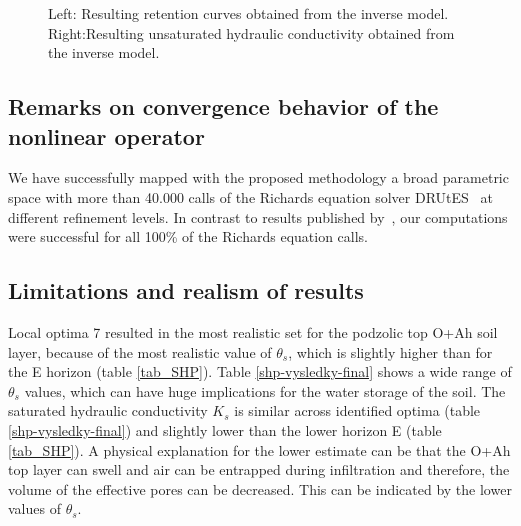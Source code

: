 \documentclass[review,times,3p,10pt]{elsarticle}
\begin{document}
\begin{figure}
\centering
{}
\caption{Left: Resulting retention curves obtained from the inverse model. Right:Resulting unsaturated hydraulic conductivity obtained from the inverse model. }
\label{retc-final}
\end{figure}

{
\subsection{Remarks on convergence behavior of the nonlinear operator}
\label{convsolver}
  We have successfully mapped with the proposed methodology a broad parametric space with more than 40.000 calls of the Richards equation solver DRUtES~\citep{drutes} at different refinement levels. In contrast to  results published by~\cite{beven2003-uncertain}, our computations were successful for all 100\% of the Richards equation calls. }  


\subsection{Limitations and realism of results}


Local optima 7 resulted in the most realistic set for the podzolic top O+Ah soil layer, because of the most realistic value of $\theta_s$, which is slightly higher than for the E horizon (table \ref{tab_SHP}). Table \ref{shp-vysledky-final} shows a wide range of $\theta_s$ values, which can have huge implications for the water storage of the soil. The saturated hydraulic conductivity $K_s$ is similar across identified optima (table \ref{shp-vysledky-final}) and slightly lower than the lower horizon E (table \ref{tab_SHP}). A physical explanation for the lower estimate can be that the O+Ah top layer can swell and air can be entrapped during infiltration and therefore, the volume of the effective pores can be decreased. This can be indicated by the lower values of $\theta_s$. 
\end{document}

